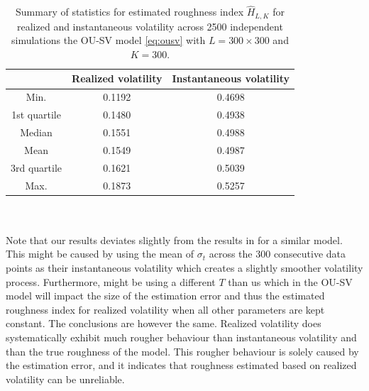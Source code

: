 \documentclass{article}
\begin{document}
\begin{table}[htbp]
    \centering
    \begin{tabular}{ccc}
        \toprule
         & Realized volatility & Instantaneous volatility \\
        \midrule
        Min. & 0.1192 & 0.4698 \\
        1st quartile & 0.1480 & 0.4938 \\
        Median & 0.1551 & 0.4988 \\
        Mean & 0.1549 & 0.4987 \\
        3rd quartile & 0.1621 & 0.5039 \\
        Max. & 0.1873 & 0.5257 \\
        \bottomrule
    \end{tabular}
    \caption{Summary of statistics for estimated roughness index $\hat{H}_{L,K}$ for realized and instantaneous volatility across 2500 independent simulations the OU-SV model \eqref{eq:ousv} with $L=300\times 300$ and $K=300$.}
    \label{tab:ex6dens}
\end{table}\\\\
Note that our results deviates slightly from the results in \cite{cont} for a similar model. This might be caused by \cite{cont} using the mean of $\sigma_t$ across the 300 consecutive data points as their instantaneous volatility which creates a slightly smoother volatility process. Furthermore, \cite{cont} might be using a different $T$ than us which in the OU-SV model will impact the size of the estimation error and thus the estimated roughness index for realized volatility when all other parameters are kept constant. The conclusions are however the same. Realized volatility does systematically exhibit much rougher behaviour than instantaneous volatility and than the true roughness of the model. This rougher behaviour is solely caused by the estimation error, and it indicates that roughness estimated based on realized volatility can be unreliable.\\\\
\end{document}
